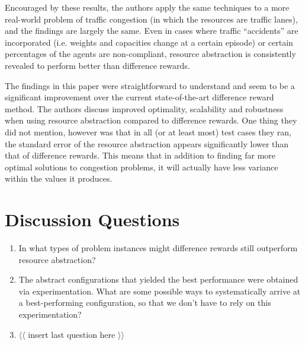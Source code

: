 \documentclass{article}
\begin{document}
Encouraged by these results, the authors apply the same techniques to a more real-world problem of traffic congestion (in which the resources are traffic lanes), and the findings are 
largely the same. Even in cases where traffic ``accidents'' are incorporated (i.e. weights and capacities change at a certain episode) or certain percentages of the agents are 
non-compliant, resource abstraction is consistently revealed to perform better than difference rewards.

The findings in this paper were straightforward to understand and seem to be a significant improvement over the current state-of-the-art difference reward method. 
The authors discuss improved optimality, scalability and robustness when using resource abstraction compared to difference rewards. 
One thing they did not mention, however was that in all (or at least most) test cases they ran, the standard error of the resource abstraction appears significantly lower than that of 
difference rewards. This means that in addition to finding far more optimal solutions to congestion problems, it will actually have less variance within the values it produces. 

\section{Discussion Questions}
\begin{enumerate}
\item In what types of problem instances might difference rewards still outperform resource abstraction?
\item The abstract configurations that yielded the best performance were obtained via experimentation. What are some possible ways to systematically arrive at a 
	best-performing configuration, so that we don't have to rely on this experimentation?
\item $ \langle \langle $ insert last question here $ \rangle \rangle $

\end{enumerate}
\end{document}
